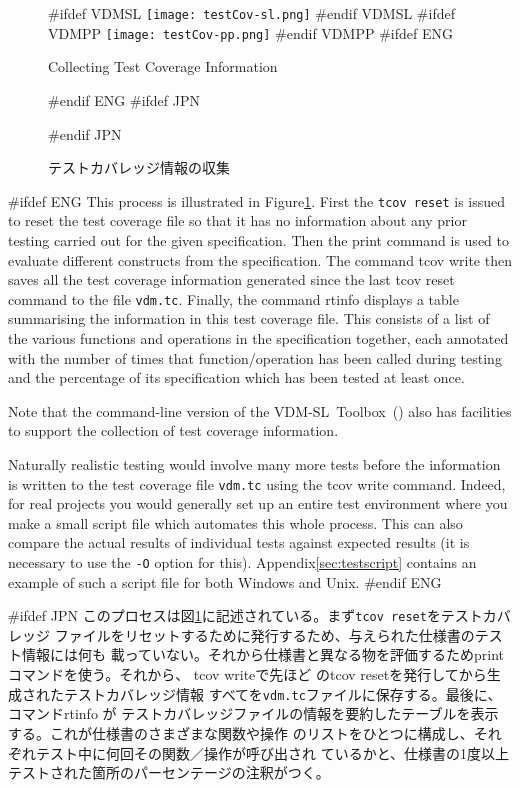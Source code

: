 \documentclass[\pformat,12pt]{article}
\newcommand{\vdmslpp}{VDM-SL}
\newcommand{\Toolbox}{Toolbox}
\newcommand{\vdmslpp}{VDM++}
\newcommand{\Toolbox}{Toolbox}
\newcommand{\guicmd}[1]{{\sf #1}}
\newcommand{\guicmd}[1]{{\gt #1}}
\begin{document}
\begin{figure}[tbh]
\begin{center}
#ifdef VDMSL
\texttt{[image: testCov-sl.png]}
#endif VDMSL
#ifdef VDMPP
\texttt{[image: testCov-pp.png]}
#endif VDMPP
#ifdef ENG
\caption{Collecting Test Coverage Information}
#endif ENG
#ifdef JPN
\caption{テストカバレッジ情報の収集}
#endif JPN
\label{fig:guitcov}
\end{center}
\end{figure}

#ifdef ENG
This process is illustrated in Figure\ref{fig:guitcov}. First the 
{\tt tcov reset} is issued to
reset the test coverage file so that it has no information about any
prior testing carried out for the given specification. Then the
\guicmd{print} command is used to evaluate different constructs from
the specification. The command \guicmd{tcov write} then saves all the test coverage information
generated since the last \guicmd{tcov reset} command to the file
\texttt{vdm.tc}. Finally, the command \guicmd{rtinfo} 
displays a table summarising the information in
this test coverage 
file. This consists of a list of the various functions and operations
in the specification together, each annotated with the number of times
that function/operation has been called during testing and the
percentage of its specification which has been tested at least once.

Note that the command-line version of the \vdmslpp\ \Toolbox\ 
() also
has facilities to support the collection of test coverage
information.

Naturally realistic testing would involve many more tests before the
information is written to the test coverage file \texttt{vdm.tc} using the
\guicmd{tcov write} command. Indeed, for
real projects you would generally set up an entire test environment 
where you make a small script file which automates this whole
process. This can also compare the actual results of individual tests
against expected results (it is necessary to use the {\tt -O} option
for this).  Appendix\ref{sec:testscript} contains an example of such
a script file for both Windows and Unix.
#endif ENG

#ifdef JPN
このプロセスは図\ref{fig:guitcov}に記述されている。まず{\tt tcov reset}をテストカバレッジ
ファイルをリセットするために発行するため、与えられた仕様書のテスト情報には何も
載っていない。それから仕様書と異なる物を評価するため\guicmd{print}コマンドを使う。それから、
\guicmd{tcov write}で先ほど
の\guicmd{tcov reset}を発行してから生成されたテストカバレッジ情報
すべてを\texttt{vdm.tc}ファイルに保存する。最後に、コマンド\guicmd{rtinfo} が
テストカバレッジファイルの情報を要約したテーブルを表示する。これが仕様書のさまざまな関数や操作
のリストをひとつに構成し、それぞれテスト中に何回その関数／操作が呼び出され
ているかと、仕様書の1度以上テストされた箇所のパーセンテージの注釈がつく。
\end{document}
